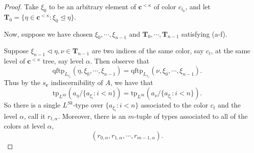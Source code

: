 \documentclass{article}
\newcommand{\dom}{\text{dom }}
\newcommand{\tp}{\text{tp}}
\newcommand{\qftp}{\text{qftp}}
\theoremstyle{definition}
\theoremstyle{definition}
\theoremstyle{definition}
\theoremstyle{definition}
\begin{document}
\begin{proof}
    Take $\xi_0$ to be an arbitrary element of $\textbf{c}^{<\kappa}$ of color $c_{i_0}$, and let $\textbf{T}_0=\{\eta\in\textbf{c}^{<\kappa}\colon \xi_0\trianglelefteq\eta\}$.
    

    Now, suppose we have chosen $\xi_0,\dotsm, \xi_{n-1}$ and $\textbf{T}_0,\dotsm, \textbf{T}_{n-1}$ satisfying (a-f). %

    Suppose $\xi_{n-1}\triangleleft\eta,\nu\in\textbf{T}_{n-1}$ are two indices of the same color, say $c_t$, at the same level of $\textbf{c}^{<\kappa}$ tree, say level $\alpha$. Then observe that $$\qftp_{L_{s_\textbf{c}}}(\eta,\xi_0,\dotsm, \xi_{n-1})=\qftp_{L_{s_\textbf{c}}}(\nu,\xi_0,\dotsm, \xi_{n-1}).$$
    Thus by the $s_\textbf{c}$ indiscernibility of $A$, we have that 
    $$\tp_{L^{Sk}}(a_\eta/\{a_{\xi_i}\colon i<n\})=\tp_{L^{Sk}}(a_\nu/\{a_{\xi_i}\colon i<n\}).$$
    So there is a single ${L^{Sk}}$-type over $\{a_{\xi_i}\colon i<n\}$ associated to the color $c_t$ and the level $\alpha$, call it $r_{t,\alpha}$. Moreover, there is an $m$-tuple of types associated to all of the colors at level $\alpha$, $$(r_{0,\alpha},r_{1,\alpha},\dotsm, r_{m-1,\alpha}).$$


\end{proof}
\end{document}

